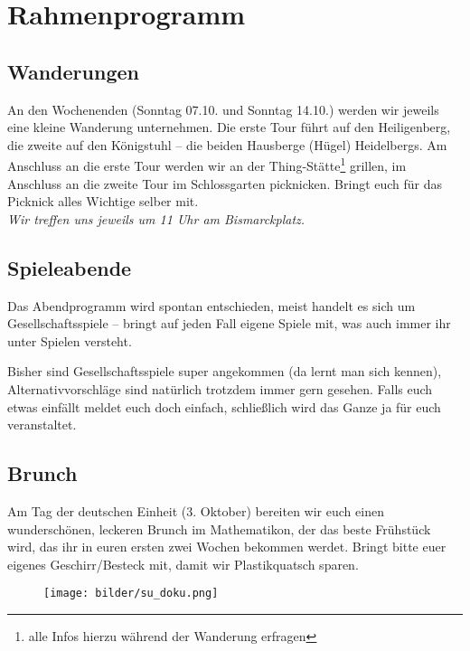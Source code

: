 \section{Rahmenprogramm}
\subsection{Wanderungen}
An den Wochenenden (Sonntag 07.10. und Sonntag 14.10.) werden wir jeweils eine kleine Wanderung unternehmen. Die erste Tour führt auf den Heiligenberg, die zweite auf den Königstuhl -- die beiden Hausberge (Hügel) Heidelbergs. Am Anschluss an die erste Tour werden wir an der Thing-Stätte\footnote{alle Infos hierzu während der Wanderung erfragen} grillen, im Anschluss an die zweite Tour im Schlossgarten picknicken. Bringt euch für das Picknick alles Wichtige selber mit.\\

\noindent\emph{Wir treffen uns jeweils um 11 Uhr am Bismarckplatz.}

\vfill


\eject

\subsection{Spieleabende}
Das Abendprogramm wird spontan entschieden, meist handelt es sich um Gesellschaftsspiele -- bringt auf jeden Fall eigene Spiele mit, was auch immer ihr unter Spielen versteht. 

Bisher sind Gesellschaftsspiele super angekommen (da lernt man sich kennen), Alternativvorschläge sind natürlich trotzdem immer gern gesehen. Falls euch etwas einfällt meldet euch doch einfach, schließlich wird das Ganze ja für euch veranstaltet.

\subsection{Brunch}
Am Tag der deutschen Einheit (3. Oktober) bereiten wir euch einen wunderschönen, leckeren Brunch im \gls{Mathematikon}, der das beste Frühstück wird, das ihr in euren ersten zwei Wochen bekommen werdet. Bringt bitte euer eigenes Geschirr/Besteck mit, damit wir Plastikquatsch sparen.

\vspace{4cm}

\begin{figure}[h]
\centering
\texttt{[image: bilder/su\_doku.png]}
\end{figure}